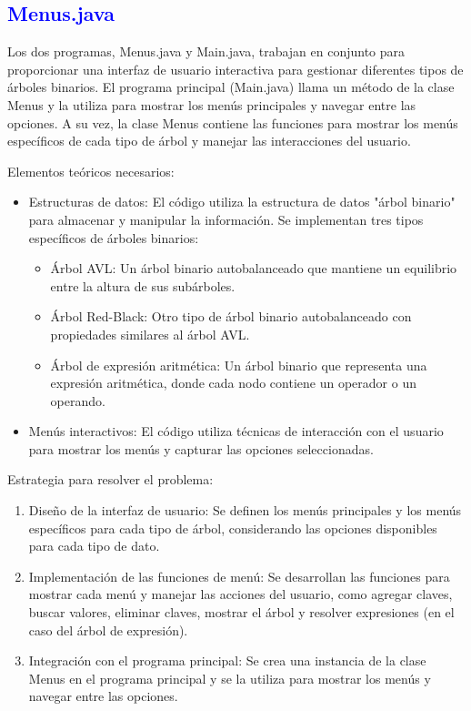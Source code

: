 \documentclass[12pt]{article}
\begin{document}
\subsection*{\textcolor{blue}{Menus.java}}
Los dos programas, Menus.java y Main.java, trabajan en conjunto para proporcionar una interfaz de usuario interactiva para gestionar diferentes tipos de árboles binarios. El programa principal (Main.java) llama un método de la clase Menus y la utiliza para mostrar los menús principales y navegar entre las opciones. A su vez, la clase Menus contiene las funciones para mostrar los menús específicos de cada tipo de árbol y manejar las interacciones del usuario.
\par\vspace{0cm}
Elementos teóricos necesarios:
\begin{itemize}
    \item Estructuras de datos: El código utiliza la estructura de datos "árbol binario" para almacenar y manipular la información. Se implementan tres tipos específicos de árboles binarios:
    \begin{itemize}
        \item Árbol AVL: Un árbol binario autobalanceado que mantiene un equilibrio entre la altura de sus subárboles.
        \item Árbol Red-Black: Otro tipo de árbol binario autobalanceado con propiedades similares al árbol AVL.
        \item Árbol de expresión aritmética: Un árbol binario que representa una expresión aritmética, donde cada nodo contiene un operador o un operando.
    \end{itemize}
    \item Menús interactivos: El código utiliza técnicas de interacción con el usuario para mostrar los menús y capturar las opciones seleccionadas.
\end{itemize}
Estrategia para resolver el problema:
\begin{enumerate}
    \item Diseño de la interfaz de usuario: Se definen los menús principales y los menús específicos para cada tipo de árbol, considerando las opciones disponibles para cada tipo de dato.
    \item Implementación de las funciones de menú: Se desarrollan las funciones para mostrar cada menú y manejar las acciones del usuario, como agregar claves, buscar valores, eliminar claves, mostrar el árbol y resolver expresiones (en el caso del árbol de expresión).
    \item Integración con el programa principal: Se crea una instancia de la clase Menus en el programa principal y se la utiliza para mostrar los menús y navegar entre las opciones.
\end{enumerate}
\end{document}
